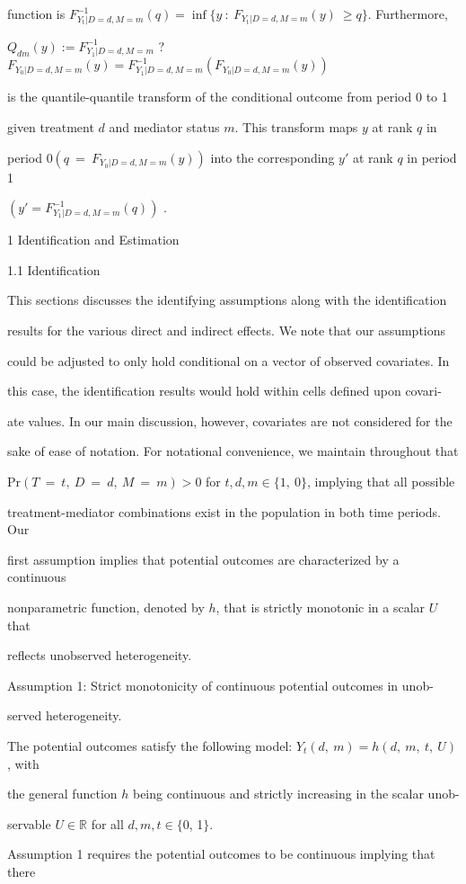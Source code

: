 \documentclass[a4paper,12pt]{article}
\begin{document}
function is $F_{Y_{\mathrm{t}}|D=d,M=m}^{-1}(q)=\displaystyle \inf\{y\ :\ F_{Y_{\mathrm{t}}|D=d,M=m}(y)\ \geq q\}$. Furthermore,

$Q_{dm}(y) :=F_{Y_{1}|D=d,M=m}^{-1}$ ? $F_{Y_{0}|D=d,M=m}(y)=F_{Y_{1}|D=d,M=m}^{-1}(F_{Y_{0}|D=d,M=m}(y))$

is the quantile-quantile transform of the conditional outcome from period $0$ to 1

given treatment $d$ and mediator status $m$. This transform maps $y$ at rank $q$ in

period $0 (q\ =\ F_{Y_{0}|D=d,M=m}(y))$ into the corresponding $y'$ at rank $q$ in period 1

$(y'=F_{Y_{1}|D=d,M=m}^{-1}(q))$ .

1 Identification and Estimation

1.1 Identification

This sections discusses the identifying assumptions along with the identification

results for the various direct and indirect effects. We note that our assumptions

could be adjusted to only hold conditional on a vector of observed covariates. In

this case, the identification results would hold within cells defined upon covari-

ate values. In our main discussion, however, covariates are not considered for the

sake of ease of notation. For notational convenience, we maintain throughout that

$\mathrm{P}\mathrm{r} (T\ =\ t,\ D\ =\ d,\ M\ =\ m) > 0$ for $t, d, m \in \{1,\ 0\}$, implying that all possible

treatment-mediator combinations exist in the population in both time periods. Our

first assumption implies that potential outcomes are characterized by a continuous

nonparametric function, denoted by $h$, that is strictly monotonic in a scalar $U$ that

reflects unobserved heterogeneity.

Assumption 1: Strict monotonicity of continuous potential outcomes in unob-

served heterogeneity.

The potential outcomes satisfy the following model: $Y_{t}(d,\ m) = h(d,\ m,\ t,\ U)$ , with

the general function $h$ being continuous and strictly increasing in the scalar unob-

servable $U\in \mathbb{R}$ for all $d, m, t\in\{0$, 1$\}.$

Assumption 1 requires the potential outcomes to be continuous implying that there
\end{document}
